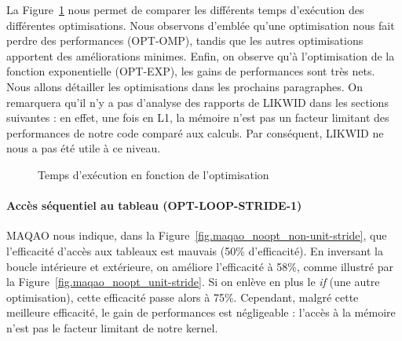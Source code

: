 \documentclass[12pt,a4paper]{article}
\begin{document}
La Figure~\ref{fig.compare-optims} nous permet de comparer les différents temps
d'exécution des différentes optimisations. Nous observons d'emblée qu'une
optimisation nous fait perdre des performances (OPT-OMP), tandis que les autres
optimisations apportent des améliorations minimes. Enfin, on observe qu'à
l'optimisation de la fonction exponentielle (OPT-EXP), les gains de performances
sont très nets. Nous allons détailler les optimisations dans les prochains
paragraphes. On remarquera qu'il n'y a pas d'analyse des rapports de LIKWID dans
les sections suivantes : en effet, une fois en L1, la mémoire n'est pas un
facteur limitant des performances de notre code comparé aux calculs. Par
conséquent, LIKWID ne nous a pas été utile à ce niveau.
\begin{figure}[h]
    \begin{center}
        \caption{Temps d'exécution en fonction de l'optimisation}
        \label{fig.compare-optims}
    \end{center}
\end{figure}

\paragraph{Accès séquentiel au tableau (OPT-LOOP-STRIDE-1)} MAQAO nous indique,
dans la Figure~\ref{fig.maqao_noopt_non-unit-stride}, que l'efficacité d'accès
aux tableaux est mauvais (50\% d'efficacité). En inversant la boucle intérieure
et extérieure, on améliore l'efficacité à 58\%, comme illustré par la
Figure~\ref{fig.maqao_noopt_unit-stride}. Si on enlève en plus le \textit{if}
(une autre optimisation), cette efficacité passe alors à 75\%. Cependant, malgré
cette meilleure efficacité, le gain de performances est négligeable : l'accès à la
mémoire n'est pas le facteur limitant de notre kernel.
\end{document}
